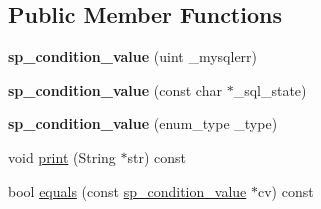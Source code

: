 \subsection*{Public Member Functions}
\begin{DoxyCompactItemize}
\item 
\mbox{\label{classsp__condition__value_abc56e64cef6ea99b183dfd4c2e70ea1e}} 
{\bfseries sp\+\_\+condition\+\_\+value} (uint \+\_\+mysqlerr)
\item 
\mbox{\label{classsp__condition__value_a589fd7dadc992eecf945257abaaa7689}} 
{\bfseries sp\+\_\+condition\+\_\+value} (const char $\ast$\+\_\+sql\+\_\+state)
\item 
\mbox{\label{classsp__condition__value_a889140add54b9b98e8588a95df0a22af}} 
{\bfseries sp\+\_\+condition\+\_\+value} (enum\+\_\+type \+\_\+type)
\item 
void \mbox{\hyperlink{classsp__condition__value_aa6400b2ead821963ed73462ecd2f4f75}{print}} (String $\ast$str) const
\item 
bool \mbox{\hyperlink{classsp__condition__value_a35b9fba60f8d0d13142ebfc19968ea2d}{equals}} (const \mbox{\hyperlink{classsp__condition__value}{sp\+\_\+condition\+\_\+value}} $\ast$cv) const
\end{DoxyCompactItemize}

